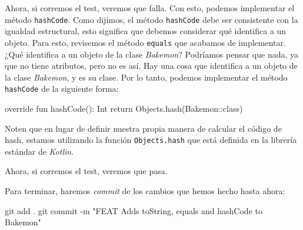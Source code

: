   Ahora, si corremos el test, veremos que falla.
  Con esto, podemos implementar el método \texttt{hashCode}.
  Como dijimos, el método \texttt{hashCode} debe ser consistente con la igualdad estructural, esto
  significa que debemos considerar qué identifica a un objeto.
  Para esto, revisemos el método \texttt{equals} que acabamos de implementar.
  ¿Qué identifica a un objeto de la clase \textit{Bakemon}?
  Podríamos pensar que nada, ya que no tiene atributos, pero no es así.
  Hay una cosa que identifica a un objeto de la clase \textit{Bakemon}, y es su clase.
  Por lo tanto, podemos implementar el método \texttt{hashCode} de la siguiente forma:

  \begin{kotlin}
    override fun hashCode(): Int {
      return Objects.hash(Bakemon::class)
    }
  \end{kotlin}

  Noten que en lugar de definir nuestra propia manera de calcular el código de hash, estamos
  utilizando la función \texttt{Objects.hash} que está definida en la librería estándar de
  \textit{Kotlin}.

  Ahora, si corremos el test, veremos que pasa.

  Para terminar, haremos \textit{commit} de los cambios que hemos hecho hasta ahora:

  \begin{powershell}
    git add .
    git commit -m "FEAT Adds toString, equals and hashCode to Bakemon"
  \end{powershell}